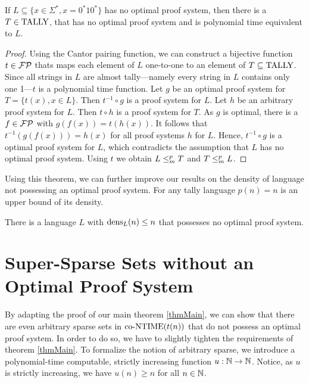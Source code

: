   \begin{theorem} \label{thmTally}
    If \(L \subseteq \{ x \in \Sigma^*, x = 0^*10^* \}\) has no optimal proof system, then there is a \(T \in \text{TALLY}\), that has no optimal proof system and is polynomial time equivalent to \(L\).
  \end{theorem}

  \begin{proof}
    Using the Cantor pairing function, we can construct a bijective function \(t \in \mathcal{FP}\) thats maps each element of \(L\) one-to-one to an element of \(T \subseteq \text{TALLY}\). Since all strings in \(L\) are almost tally---namely every string in \(L\) contains only one 1---\(t\) is a polynomial time function. Let \(g\) be an optimal proof system for \(T = \{ t(x), x \in L \}\). Then \(t^{-1} \circ g\) is a proof system for \(L\). Let \(h\) be an arbitrary proof system for \(L\). Then \(t \circ h\) is a proof system for \(T\). As \(g\) is optimal, there is a \(f \in \mathcal{FP}\) with \(g(f(x)) = t(h(x))\). It follows that \(t^{-1}(g(f(x))) = h(x)\) for all proof systems \(h\) for \(L\). Hence, \(t^{-1} \circ g\) is a optimal proof system for \(L\), which contradicts the assumption that \(L\) has no optimal proof system. Using \(t\) we obtain \(L \leq_{m}^{p} T\) and \(T \leq_{m}^{p} L\).
  \end{proof}
  
  Using this theorem, we can further improve our results on the density of language not possessing an optimal proof system. For any tally language \(p(n) = n\) is an upper bound of its density.

  \begin{corollary}
    There is a language \(L\) with \(\operatorname{dens}_L(n) \leq n\) that possesses no optimal proof system.
  \end{corollary}

  \section{Super-Sparse Sets without an Optimal Proof System}

  By adapting the proof of our main theorem \ref{thmMain}, we can show that there are even arbitrary sparse sets in \(\text{co-NTIME}(t(n))\) that do not possess an optimal proof system. In order to do so, we have to slightly tighten the requirements of theorem \ref{thmMain}. To formalize the notion of arbitrary sparse, we introduce a polynomial-time computable, strictly increasing function \(u : \mathbb{N} \to \mathbb{N}\). Notice, as \(u\) is strictly increasing, we have \(u(n) \geq n\) for all \(n \in \mathbb{N}\).

